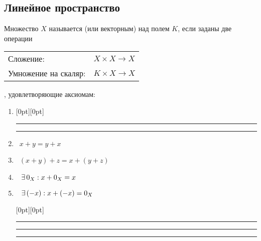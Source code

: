 \subsection{Линейное пространство}

\begin{opr} %
	Множество $X$ называется  (или векторным) над полем $K$, если заданы две операции\\[5pt]
	\begin{tabular}{ll}
		Сложение: & $X \times X \to X$ \quad {\small $\bigl((x, y) \mapsto x + y\bigr)$}\\
		Умножение на скаляр: & $K \times X \to X$ \quad {\small$\bigl((\alpha, x\bigr) \mapsto \alpha \cdot x)$}\\
	\end{tabular},
	\smallskip
	удовлетворяющие аксиомам:
	\begin{enumerate} %
		\item[]\hspace{-2em}\vspace{-.75em}
		\raisebox{0pt}[0pt][0pt]%
		{%
			\rule[2pt]{4.843cm}{0.1pt}%
			\fboxrule=0.1pt%
			\fboxsep=2.5pt%
			\rule[2pt]{4.843cm}{0.1pt}%
		}%
		\vspace{.8em}
		\item {} \ $x + y = y + x$ 
		
		\item {} \ $(x + y) + z = x + (y + z)$
		
		\item {}$\E 0_X : x + 0_X = x$
		
		\item {}$\E (-x) : x + (-x) = 0_X $
		
		\vspace{-1.3ex}\hspace{-2em}
		\raisebox{0pt}[0pt][0pt]%
		{%
			\rule[2pt]{0.1pt}{2.57cm}%
			\rule[2pt]{15.1cm}{0.2pt}%
			\rule[2pt]{0.1pt}{2.57cm}%
		}%
		\vspace{-.9ex}
		

\end{enumerate}
\end{opr}
